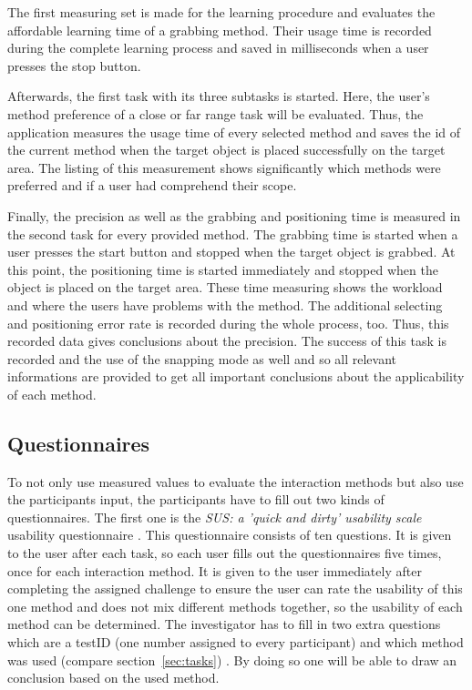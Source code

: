 The first measuring set is made for the learning procedure and evaluates the affordable learning time of a grabbing method. Their usage time is recorded during the complete learning process and saved in milliseconds when a user presses the stop button. 

Afterwards, the first task with its three subtasks is started. Here, the user's method preference of a close or far range task will be evaluated. Thus, the application measures the usage time of every selected method and saves the id of the current method when the target object is placed successfully on the target area. The listing of this measurement shows significantly which methods were preferred and if a user had comprehend their scope.  

Finally, the precision as well as the grabbing and positioning time is measured in the second task for every provided method. The grabbing time is started when a user presses the start button and stopped when the target object is grabbed. At this point, the positioning time is started immediately and stopped when the object is placed on the target area. These time measuring shows the workload and where the users have problems with the method. The additional selecting and positioning error rate is recorded during the whole process, too. Thus, this recorded data gives conclusions about the precision. The success of this task is recorded and the use of the snapping mode as well and so all relevant informations are provided to get all important conclusions about the applicability of each method. 

\subsection{Questionnaires} \label{sec:questionnaires}

To not only use measured values to evaluate the interaction methods but also use the participants input, the participants have to fill out two kinds of questionnaires. The first one is the \textit{SUS: a 'quick and dirty' usability scale} usability questionnaire \citep{6sus}. This questionnaire consists of ten questions. It is given to the user after each task, so each user fills out the questionnaires five times, once for each interaction method. It is given to the user immediately after completing the assigned challenge to ensure the user can rate the usability of this one method and does not mix different methods together, so the usability of each method can be determined. The investigator has to fill in two extra questions which are a testID (one number assigned to every participant) and which method was used (compare section~\ref{sec:tasks}) . By doing so one will be able to draw an conclusion based on the used method. \\ 

